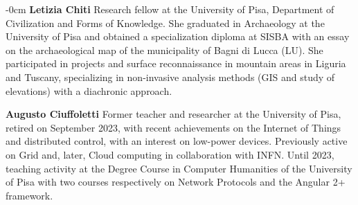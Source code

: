 \documentclass[sustainability,article,submit,pdftex,moreauthors]{Definitions/mdpi}
\begin{document}
\begin{adjustwidth}{-\extralength}{0cm}
\bio
{}
{\textbf{Letizia Chiti} Research fellow at the University of Pisa, Department of Civilization and Forms of Knowledge. She graduated in Archaeology at the University of Pisa and obtained a specialization diploma at SISBA with an essay on the archaeological map of the municipality of Bagni di Lucca (LU). She participated in projects and surface reconnaissance in mountain areas in Liguria and Tuscany, specializing in non-invasive analysis methods (GIS and study of elevations) with a diachronic approach.}

\bio
{}
{\textbf{Augusto Ciuffoletti} Former teacher and researcher at the University of Pisa, retired on September 2023, with recent achievements on the Internet of Things and distributed control, with an interest on low-power devices. Previously active on Grid and, later, Cloud computing in collaboration with INFN. Until 2023, teaching activity at the Degree Course in Computer Humanities of the University of Pisa with two courses respectively on Network Protocols and the Angular 2+ framework.}

\PublishersNote{}
\end{adjustwidth}
\end{document}

